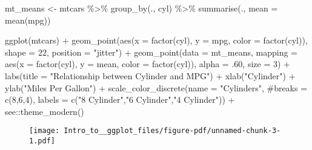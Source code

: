 \documentclass[
  letterpaper,
  DIV=11,
  numbers=noendperiod]{scrartcl}
\newenvironment{Shaded}{\begin{snugshade}}{\end{snugshade}}
\newcommand{\AttributeTok}[1]{\textcolor[rgb]{0.40,0.45,0.13}{#1}}
\newcommand{\CommentTok}[1]{\textcolor[rgb]{0.37,0.37,0.37}{#1}}
\newcommand{\DecValTok}[1]{\textcolor[rgb]{0.68,0.00,0.00}{#1}}
\newcommand{\FunctionTok}[1]{\textcolor[rgb]{0.28,0.35,0.67}{#1}}
\newcommand{\NormalTok}[1]{\textcolor[rgb]{0.00,0.23,0.31}{#1}}
\newcommand{\OtherTok}[1]{\textcolor[rgb]{0.00,0.23,0.31}{#1}}
\newcommand{\SpecialCharTok}[1]{\textcolor[rgb]{0.37,0.37,0.37}{#1}}
\newcommand{\StringTok}[1]{\textcolor[rgb]{0.13,0.47,0.30}{#1}}
\begin{document}
\begin{Shaded}
\begin{Highlighting}[]
\NormalTok{mt\_means }\OtherTok{\textless{}{-}}\NormalTok{ mtcars }\SpecialCharTok{\%\textgreater{}\%} \FunctionTok{group\_by}\NormalTok{(., cyl) }\SpecialCharTok{\%\textgreater{}\%} \FunctionTok{summarise}\NormalTok{(., }\AttributeTok{mean =} \FunctionTok{mean}\NormalTok{(mpg))}

\FunctionTok{ggplot}\NormalTok{(mtcars) }\SpecialCharTok{+}
  \FunctionTok{geom\_point}\NormalTok{(}\FunctionTok{aes}\NormalTok{(}\AttributeTok{x =} \FunctionTok{factor}\NormalTok{(cyl), }
                 \AttributeTok{y =}\NormalTok{ mpg, }
                 \AttributeTok{color =} \FunctionTok{factor}\NormalTok{(cyl)),}
             \AttributeTok{shape =} \DecValTok{22}\NormalTok{, }\AttributeTok{position =} \StringTok{"jitter"}\NormalTok{) }\SpecialCharTok{+} 
  \FunctionTok{geom\_point}\NormalTok{(}\AttributeTok{data =}\NormalTok{ mt\_means, }
             \AttributeTok{mapping =} \FunctionTok{aes}\NormalTok{(}\AttributeTok{x =} \FunctionTok{factor}\NormalTok{(cyl),}
                           \AttributeTok{y =}\NormalTok{ mean,}
                           \AttributeTok{color =} \FunctionTok{factor}\NormalTok{(cyl)),}
             \AttributeTok{alpha =}\NormalTok{ .}\DecValTok{60}\NormalTok{,}
             \AttributeTok{size =} \DecValTok{3}\NormalTok{) }\SpecialCharTok{+}
  \FunctionTok{labs}\NormalTok{(}\AttributeTok{title =} \StringTok{"Relationship between Cylinder and MPG"}\NormalTok{) }\SpecialCharTok{+}
  \FunctionTok{xlab}\NormalTok{(}\StringTok{"Cylinder"}\NormalTok{) }\SpecialCharTok{+}
  \FunctionTok{ylab}\NormalTok{(}\StringTok{"Miles Per Gallon"}\NormalTok{) }\SpecialCharTok{+}
  \FunctionTok{scale\_color\_discrete}\NormalTok{(}\AttributeTok{name =} \StringTok{"Cylinders"}\NormalTok{,}
                       \CommentTok{\#breaks = c(8,6,4),}
                       \AttributeTok{labels =} \FunctionTok{c}\NormalTok{(}\StringTok{"8 Cylinder"}\NormalTok{,}\StringTok{"6 Cylinder"}\NormalTok{,}\StringTok{"4 Cylinder"}\NormalTok{)) }\SpecialCharTok{+}
\NormalTok{  see}\SpecialCharTok{::}\FunctionTok{theme\_modern}\NormalTok{()}
\end{Highlighting}
\end{Shaded}

\begin{figure}[H]

{\centering \texttt{[image: Intro\_to\_\_ggplot\_files/figure-pdf/unnamed-chunk-3-1.pdf]}

}

\end{figure}
\end{document}
